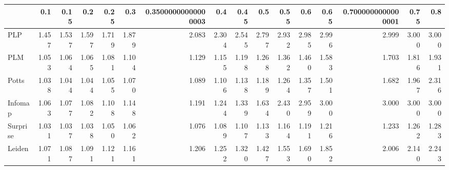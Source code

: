 \begin{tabular}{lrrrrrrrrrrrrrrr}
\toprule
{} &   0.1 &  0.15 &   0.2 &  0.25 &   0.3 & 0.35000000000000003 &   0.4 &  0.45 &   0.5 &  0.55 &   0.6 &  0.65 & 0.7000000000000001 &  0.75 &   0.8 \\
\midrule
PLP      & 1.457 & 1.537 & 1.597 & 1.719 & 1.879 &               2.083 & 2.304 & 2.545 & 2.797 & 2.932 & 2.985 & 2.996 &              2.999 & 3.000 & 3.000 \\
PLM      & 1.053 & 1.064 & 1.065 & 1.081 & 1.104 &               1.129 & 1.155 & 1.198 & 1.268 & 1.362 & 1.460 & 1.583 &              1.703 & 1.816 & 1.931 \\
Potts    & 1.038 & 1.044 & 1.044 & 1.055 & 1.070 &               1.089 & 1.106 & 1.138 & 1.189 & 1.264 & 1.357 & 1.501 &              1.682 & 1.967 & 2.316 \\
Infomap  & 1.063 & 1.077 & 1.082 & 1.108 & 1.148 &               1.191 & 1.244 & 1.339 & 1.634 & 2.430 & 2.959 & 3.000 &              3.000 & 3.000 & 3.000 \\
Surprise & 1.031 & 1.037 & 1.038 & 1.050 & 1.062 &               1.076 & 1.089 & 1.107 & 1.133 & 1.164 & 1.191 & 1.216 &              1.233 & 1.262 & 1.283 \\
Leiden   & 1.071 & 1.087 & 1.091 & 1.121 & 1.161 &               1.206 & 1.252 & 1.320 & 1.427 & 1.553 & 1.690 & 1.852 &              2.006 & 2.140 & 2.243 \\
\bottomrule
\end{tabular}
